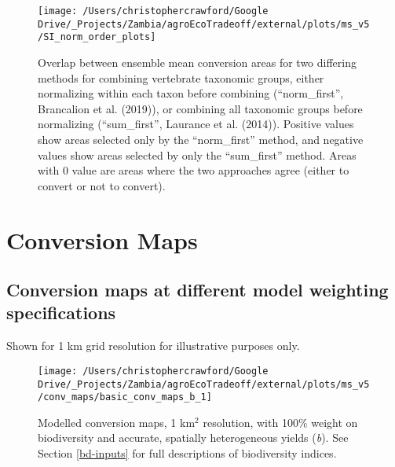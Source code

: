\documentclass[
]{article}
\begin{document}
\begin{figure}

{\centering \texttt{[image: /Users/christophercrawford/Google Drive/\_Projects/Zambia/agroEcoTradeoff/external/plots/ms\_v5/SI\_norm\_order\_plots]} 

}

\caption{Overlap between ensemble mean conversion areas for two differing methods for combining vertebrate taxonomic groups, either normalizing within each taxon before combining (``norm\_first'', Brancalion et al. (2019)), or combining all taxonomic groups before normalizing (``sum\_first'', Laurance et al. (2014)). Positive values show areas selected only by the ``norm\_first'' method, and negative values show areas selected by only the ``sum\_first'' method. Areas with 0 value are areas where the two approaches agree (either to convert or not to convert).}\label{fig:norm-order}
\end{figure}

\newpage

\hypertarget{conv-maps}{%
\section{Conversion Maps}\label{conv-maps}}

\hypertarget{conversion-maps-at-different-model-weighting-specifications}{%
\subsection{Conversion maps at different model weighting specifications}\label{conversion-maps-at-different-model-weighting-specifications}}

Shown for 1 km grid resolution for illustrative purposes only.













\begin{figure}
\texttt{[image: /Users/christophercrawford/Google Drive/\_Projects/Zambia/agroEcoTradeoff/external/plots/ms\_v5/conv\_maps/basic\_conv\_maps\_b\_1]} \caption{Modelled conversion maps, 1 km\(^2\) resolution, with 100\% weight on biodiversity and accurate, spatially heterogeneous yields (\emph{b}). See Section \ref{bd-inputs} for full descriptions of biodiversity indices.}\label{fig:conv-maps-1-b}
\end{figure}
\end{document}
